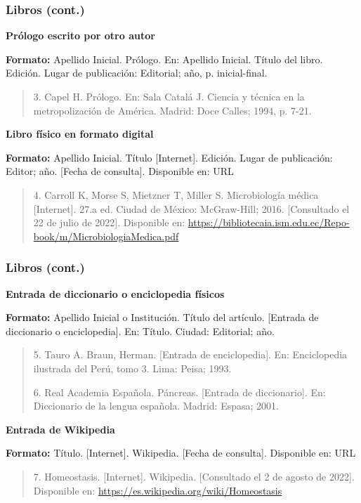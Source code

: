 \documentclass[
11pt, %
]{beamer}
\begin{document}
\begin{frame}
	\frametitle{Libros (cont.)}

	\textbf{Prólogo escrito por otro autor}

	\textbf{Formato:} Apellido Inicial. Prólogo. En: Apellido Inicial. Título del libro. Edición. Lugar de publicación: Editorial; año, p. inicial-final.

	\begin{quote}
		3.  Capel H. Prólogo. En: Sala Catalá J. Ciencia y técnica en la metropolización de América. Madrid: Doce Calles; 1994, p. 7-21.
	\end{quote}


	\textbf{Libro físico en formato digital}

	\textbf{Formato:} Apellido Inicial. Título [Internet]. Edición. Lugar de publicación: Editor; año. [Fecha de consulta]. Disponible en: URL

	\begin{quote}
		4.  Carroll K, Morse S, Mietzner T, Miller S. Microbiología médica [Internet]. 27.a ed. Ciudad de México: McGraw-Hill; 2016. [Consultado el 22 de julio de 2022]. Disponible en: \url{https://bibliotecaia.ism.edu.ec/Repo-book/m/MicrobiologiaMedica.pdf}
	\end{quote}



\end{frame}

\begin{frame}
	\frametitle{Libros (cont.)}

	\textbf{Entrada de diccionario o enciclopedia físicos}

	\textbf{Formato:} Apellido Inicial o Institución. Título del artículo. [Entrada de diccionario o enciclopedia]. En: Título. Ciudad: Editorial; año.

	\begin{quote}
		5.  Tauro A. Braun, Herman. [Entrada de enciclopedia]. En: Enciclopedia ilustrada del Perú, tomo 3. Lima: Peisa; 1993.

		6. Real Academia Española. Páncreas. [Entrada de diccionario]. En: Diccionario de la lengua española. Madrid: Espasa; 2001.

	\end{quote}



	\textbf{Entrada de Wikipedia}

	\textbf{Formato:} Título. [Internet]. Wikipedia. [Fecha de consulta]. Disponible en: URL

	\begin{quote}
		7.  Homeostasis. [Internet]. Wikipedia. [Consultado el 2 de agosto de 2022]. Disponible en: \url{https://es.wikipedia.org/wiki/Homeostasis}
	\end{quote}

\end{frame}
\end{document}
